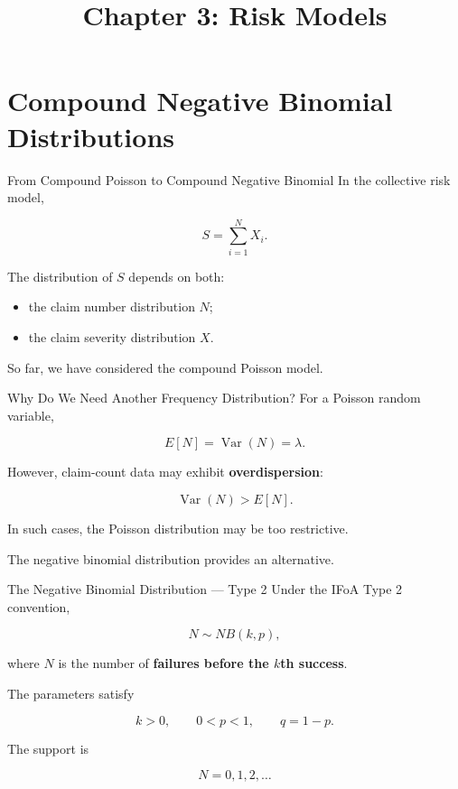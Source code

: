 \documentclass[
  ignorenonframetext,
  aspectratio=169,
]{beamer}
\title{\texorpdfstring{Chapter 3: Risk Models}{Chapter 3: Risk Models}}
\author{}
\date{}
\providecommand{\tightlist}{%
  \setlength{\itemsep}{0pt}\setlength{\parskip}{0pt}}
\begin{document}
\frame{\titlepage}


\section{Compound Negative Binomial
Distributions}\label{compound-negative-binomial}

\begin{frame}{From Compound Poisson to Compound Negative Binomial}
\protect{}\label{from-compound-poisson-to-compound-negative-binomial}
In the collective risk model,

\[
S=\sum_{i=1}^{N}X_i.
\]

The distribution of \(S\) depends on both:

\begin{itemize}
\tightlist
\item
  the claim number distribution \(N\);
\item
  the claim severity distribution \(X\).
\end{itemize}

So far, we have considered the compound Poisson model.
\end{frame}

\begin{frame}{Why Do We Need Another Frequency Distribution?}
\protect{}\label{why-do-we-need-another-frequency-distribution}
For a Poisson random variable,

\[
E[N]=\operatorname{Var}(N)=\lambda.
\]

However, claim-count data may exhibit \textbf{overdispersion}:

\[
\operatorname{Var}(N)>E[N].
\]

In such cases, the Poisson distribution may be too restrictive.

The negative binomial distribution provides an alternative.
\end{frame}

\begin{frame}{The Negative Binomial Distribution --- Type 2}
\protect{}\label{the-negative-binomial-distribution-type-2}
Under the IFoA Type 2 convention,

\[
N\sim NB(k,p),
\]

where \(N\) is the number of \textbf{failures before the \(k\)th
success}.

The parameters satisfy

\[
k>0,\qquad 0<p<1,\qquad q=1-p.
\]

The support is

\[
N=0,1,2,\ldots
\]
\end{frame}
\end{document}
